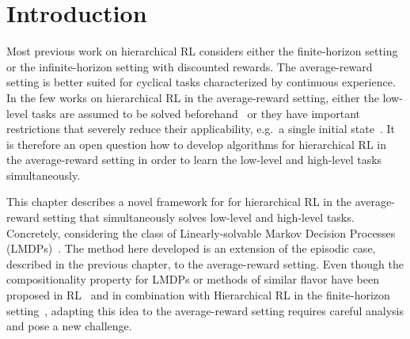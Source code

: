 \section{Introduction}

Most previous work on hierarchical RL considers either the finite-horizon setting or the infinite-horizon setting with discounted rewards.
The average-reward setting is better suited for cyclical tasks characterized by continuous experience.
In the few works on hierarchical RL in the average-reward setting, either the low-level tasks are assumed to be solved beforehand~\citep{Fruit2017,Fruit2017b,Wan2021a} or they %
have important restrictions that severely reduce their applicability, e.g.~a single initial state~\citep{Ghavamzadeh2007}. It is therefore an open question how to develop algorithms for hierarchical RL in the average-reward setting
in order to learn the low-level and high-level tasks simultaneously.



This chapter describes a novel framework for for hierarchical RL in the average-reward setting that simultaneously solves low-level and high-level tasks. Concretely, considering the class of Linearly-solvable Markov Decision Processes (LMDPs)~\citep{Todorov2006}. The method here developed is an extension of the episodic case, described in the previous chapter, to the average-reward setting. Even though the compositionality property for LMDPs or methods of similar flavor have been proposed in RL~\cite{Hunt2019,Niekerk2019,NangueTasse2020} and in combination with Hierarchical RL in the finite-horizon setting~\cite{Jonsson2016,Saxe2017,Infante2022}, adapting this idea to the average-reward setting requires careful analysis and pose a new challenge.






